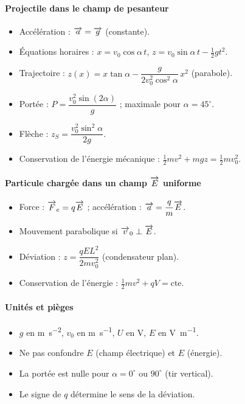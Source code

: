 \begin{synthese}
\paragraph{Projectile dans le champ de pesanteur}
\begin{itemize}
\item Accélération : $\overrightarrow{a} = \overrightarrow{g}$ (constante).
\item Équations horaires : $x = v_0\cos\alpha\,t$, $z = v_0\sin\alpha\,t - \frac12 g t^2$.
\item Trajectoire : $z(x) = x\tan\alpha - \dfrac{g}{2v_0^2\cos^2\alpha}\,x^2$ (parabole).
\item Portée : $P = \dfrac{v_0^2\sin(2\alpha)}{g}$ ; maximale pour $\alpha=45^\circ$.
\item Flèche : $z_S = \dfrac{v_0^2\sin^2\alpha}{2g}$.
\item Conservation de l’énergie mécanique : $\frac12 m v^2 + mgz = \frac12 m v_0^2$.
\end{itemize}

\paragraph{Particule chargée dans un champ $\overrightarrow{E}$ uniforme}
\begin{itemize}
\item Force : $\overrightarrow{F}_e = q\overrightarrow{E}$ ; accélération : $\overrightarrow{a} = \dfrac{q}{m}\overrightarrow{E}$.
\item Mouvement parabolique si $\overrightarrow{v}_0 \perp \overrightarrow{E}$.
\item Déviation : $z = \dfrac{qE L^2}{2m v_0^2}$ (condensateur plan).
\item Conservation de l’énergie : $\frac12 m v^2 + qV = \text{cte}$.
\end{itemize}

\paragraph{Unités et pièges}
\begin{itemize}
\item $g$ en \si{\metre\per\second\squared}, $v_0$ en \si{\metre\per\second}, $U$ en \si{\volt}, $E$ en \si{\volt\per\metre}.
\item Ne pas confondre $E$ (champ électrique) et $E$ (énergie).
\item La portée est nulle pour $\alpha=0^\circ$ ou $90^\circ$ (tir vertical).
\item Le signe de $q$ détermine le sens de la déviation.
\end{itemize}
\end{synthese}

